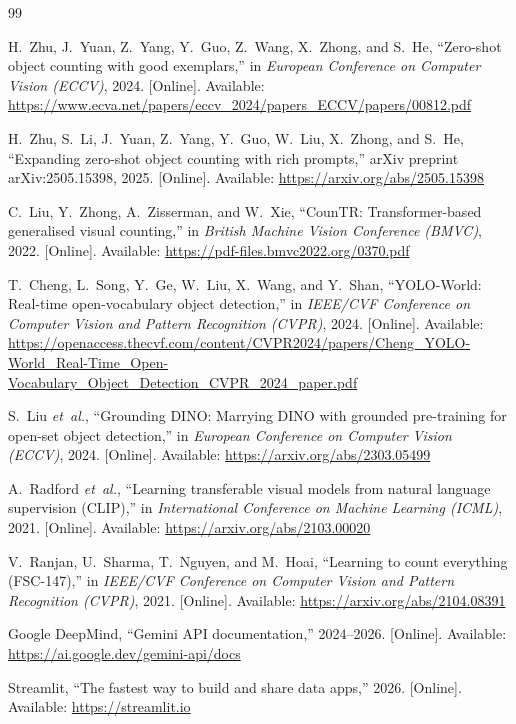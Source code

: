 \documentclass[a4paper,12pt]{report}
\numberwithin{figure}{chapter}
\numberwithin{table}{chapter}
\begin{document}
\begin{thebibliography}{99}

H.~Zhu, J.~Yuan, Z.~Yang, Y.~Guo, Z.~Wang, X.~Zhong, and S.~He,
``Zero-shot object counting with good exemplars,''
in \emph{European Conference on Computer Vision (ECCV)}, 2024.
[Online]. Available:
\url{https://www.ecva.net/papers/eccv_2024/papers_ECCV/papers/00812.pdf}

H.~Zhu, S.~Li, J.~Yuan, Z.~Yang, Y.~Guo, W.~Liu, X.~Zhong, and S.~He,
``Expanding zero-shot object counting with rich prompts,''
arXiv preprint arXiv:2505.15398, 2025.
[Online]. Available:
\url{https://arxiv.org/abs/2505.15398}

C.~Liu, Y.~Zhong, A.~Zisserman, and W.~Xie,
``CounTR: Transformer-based generalised visual counting,''
in \emph{British Machine Vision Conference (BMVC)}, 2022.
[Online]. Available:
\url{https://pdf-files.bmvc2022.org/0370.pdf}

T.~Cheng, L.~Song, Y.~Ge, W.~Liu, X.~Wang, and Y.~Shan,
``YOLO-World: Real-time open-vocabulary object detection,''
in \emph{IEEE/CVF Conference on Computer Vision and Pattern
Recognition (CVPR)}, 2024.
[Online]. Available:
\url{https://openaccess.thecvf.com/content/CVPR2024/papers/Cheng_YOLO-World_Real-Time_Open-Vocabulary_Object_Detection_CVPR_2024_paper.pdf}

S.~Liu \emph{et~al.},
``Grounding DINO: Marrying DINO with grounded pre-training
for open-set object detection,''
in \emph{European Conference on Computer Vision (ECCV)}, 2024.
[Online]. Available:
\url{https://arxiv.org/abs/2303.05499}

A.~Radford \emph{et~al.},
``Learning transferable visual models from natural language
supervision (CLIP),''
in \emph{International Conference on Machine Learning (ICML)},
2021.
[Online]. Available:
\url{https://arxiv.org/abs/2103.00020}

V.~Ranjan, U.~Sharma, T.~Nguyen, and M.~Hoai,
``Learning to count everything (FSC-147),''
in \emph{IEEE/CVF Conference on Computer Vision and Pattern
Recognition (CVPR)}, 2021.
[Online]. Available:
\url{https://arxiv.org/abs/2104.08391}

Google DeepMind, ``Gemini API documentation,'' 2024--2026.
[Online]. Available:
\url{https://ai.google.dev/gemini-api/docs}

Streamlit, ``The fastest way to build and share data apps,'' 2026.
[Online]. Available: \url{https://streamlit.io}


\end{thebibliography}
\end{document}
